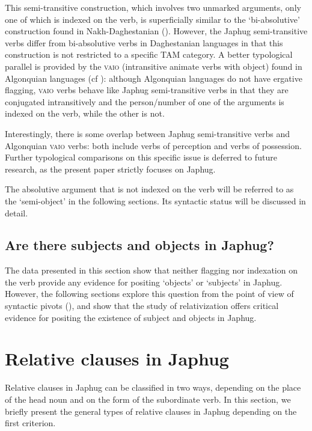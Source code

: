 \documentclass[oldfontcommands,oneside,a4paper,11pt]{article}
\begin{document}
This semi-transitive construction, which involves two unmarked arguments, only one of which is indexed on the verb, is superficially similar to the `bi-absolutive' construction found in Nakh-Daghestanian (\citealt{forker12biabsolutive}). However, the Japhug semi-transitive verbs differ from bi-absolutive verbs in Daghestanian languages in that this construction is not restricted to a specific TAM category. A better typological parallel is provided by the  \textsc{vaio} (intransitive animate verbs with object) found in Algonquian languages (cf  \citealt[242]{valentine01grammar}): although Algonquian languages do not have ergative flagging, \textsc{vaio} verbs behave like Japhug semi-transitive verbs in that they are conjugated intransitively and the person/number of one of the arguments is indexed on the verb, while the other is not.

Interestingly, there is some overlap between Japhug semi-transitive verbs and Algonquian \textsc{vaio} verbs: both include verbs of perception and verbs of possession. Further typological comparisons on this specific issue is deferred to future research, as the present paper strictly focuses on Japhug.

The absolutive argument that is not indexed on the verb will be referred to as the `semi-object' in the following sections. Its  syntactic status will be discussed in detail.

\subsection{Are there subjects and objects in Japhug?}
The data presented in this section show that neither flagging nor indexation on the verb provide any evidence for positing `objects' or `subjects' in Japhug. However, the following sections explore this question from the point of view of syntactic pivots (\citealt[275]{vanvalin97syntax}), and show that the study of relativization offers critical evidence for positing the existence of subject and objects in Japhug.

\section{Relative clauses in Japhug}
Relative clauses in Japhug can be classified in two ways, depending on the place of the head noun and on the form of the subordinate verb. In this section, we briefly present  the general types of relative clauses in Japhug depending on the first criterion.  
\end{document}
